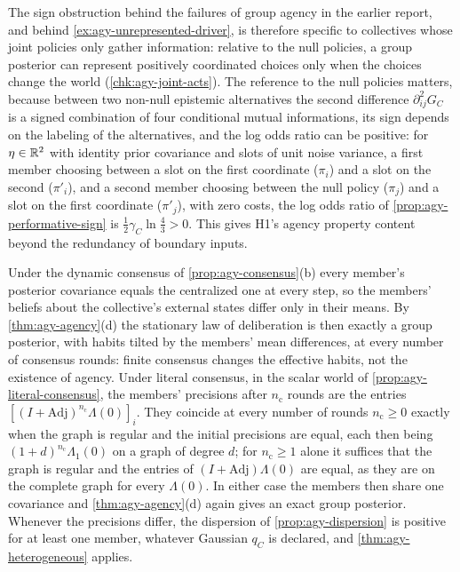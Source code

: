 The sign obstruction behind the failures of group agency in the earlier report, and behind \cref{ex:agy-unrepresented-driver}, is therefore specific to collectives whose joint policies only gather information: relative to the null policies, a group posterior can represent positively coordinated choices only when the choices change the world (\cref{chk:agy-joint-acts}). The reference to the null policies matters, because between two non-null epistemic alternatives the second difference $\partial^2_{ij}G_C$ is a signed combination of four conditional mutual informations, its sign depends on the labeling of the alternatives, and the log odds ratio can be positive: for $\eta\in\mathbb{R}^2$ with identity prior covariance and slots of unit noise variance, a first member choosing between a slot on the first coordinate ($\pi_i$) and a slot on the second ($\pi'_i$), and a second member choosing between the null policy ($\pi_j$) and a slot on the first coordinate ($\pi'_j$), with zero costs, the log odds ratio of \cref{prop:agy-performative-sign} is $\frac12\gamma_C\ln\frac43>0$. This gives H1's agency property content beyond the redundancy of boundary inputs.

\begin{remark}\label{rem:agy-consensus-agency}
Under the dynamic consensus of \cref{prop:agy-consensus}(b) every member's posterior covariance equals the centralized one at every step, so the members' beliefs about the collective's external states differ only in their means. By \cref{thm:agy-agency}(d) the stationary law of deliberation is then exactly a group posterior, with habits tilted by the members' mean differences, at every number of consensus rounds: finite consensus changes the effective habits, not the existence of agency. Under literal consensus, in the scalar world of \cref{prop:agy-literal-consensus}, the members' precisions after $n_{\mathrm c}$ rounds are the entries $[(I+\mathrm{Adj})^{n_{\mathrm c}}\Lambda(0)]_i$. They coincide at every number of rounds $n_{\mathrm c}\ge0$ exactly when the graph is regular and the initial precisions are equal, each then being $(1+d)^{n_{\mathrm c}}\Lambda_1(0)$ on a graph of degree $d$; for $n_{\mathrm c}\ge1$ alone it suffices that the graph is regular and the entries of $(I+\mathrm{Adj})\Lambda(0)$ are equal, as they are on the complete graph for every $\Lambda(0)$. In either case the members then share one covariance and \cref{thm:agy-agency}(d) again gives an exact group posterior. Whenever the precisions differ, the dispersion of \cref{prop:agy-dispersion} is positive for at least one member, whatever Gaussian $q_C$ is declared, and \cref{thm:agy-heterogeneous} applies.
\end{remark}

